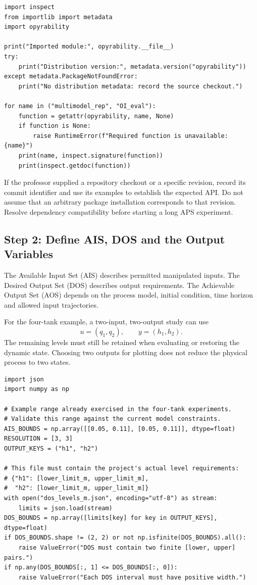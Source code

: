 \documentclass[11pt, letterpaper]{article}
\begin{document}
\begin{lstlisting}[style=pythonstyle,caption={Check package location, installed metadata and function signatures}]
import inspect
from importlib import metadata
import opyrability

print("Imported module:", opyrability.__file__)
try:
    print("Distribution version:", metadata.version("opyrability"))
except metadata.PackageNotFoundError:
    print("No distribution metadata: record the source checkout.")

for name in ("multimodel_rep", "OI_eval"):
    function = getattr(opyrability, name, None)
    if function is None:
        raise RuntimeError(f"Required function is unavailable: {name}")
    print(name, inspect.signature(function))
    print(inspect.getdoc(function))
\end{lstlisting}

If the professor supplied a repository checkout or a specific revision, record its commit identifier and use its examples to establish the expected API. Do not assume that an arbitrary package installation corresponds to that revision. Resolve dependency compatibility before starting a long APS experiment.

\subsection{Step 2: Define AIS, DOS and the Output Variables}
The Available Input Set (AIS) describes permitted manipulated inputs. The Desired Output Set (DOS) describes output requirements. The Achievable Output Set (AOS) depends on the process model, initial condition, time horizon and allowed input trajectories.

For the four-tank example, a two-input, two-output study can use
\begin{equation}
u=(q_1,q_2), \qquad y=(h_1,h_2).
\end{equation}
The remaining levels must still be retained when evaluating or restoring the dynamic state. Choosing two outputs for plotting does not reduce the physical process to two states.

\begin{lstlisting}[style=pythonstyle,caption={Example input grid and externally supplied output requirements}]
import json
import numpy as np

# Example range already exercised in the four-tank experiments.
# Validate this range against the current model constraints.
AIS_BOUNDS = np.array([[0.05, 0.11], [0.05, 0.11]], dtype=float)
RESOLUTION = [3, 3]
OUTPUT_KEYS = ("h1", "h2")

# This file must contain the project's actual level requirements:
# {"h1": [lower_limit_m, upper_limit_m],
#  "h2": [lower_limit_m, upper_limit_m]}
with open("dos_levels_m.json", encoding="utf-8") as stream:
    limits = json.load(stream)
DOS_BOUNDS = np.array([limits[key] for key in OUTPUT_KEYS], dtype=float)
if DOS_BOUNDS.shape != (2, 2) or not np.isfinite(DOS_BOUNDS).all():
    raise ValueError("DOS must contain two finite [lower, upper] pairs.")
if np.any(DOS_BOUNDS[:, 1] <= DOS_BOUNDS[:, 0]):
    raise ValueError("Each DOS interval must have positive width.")
\end{lstlisting}
\end{document}
